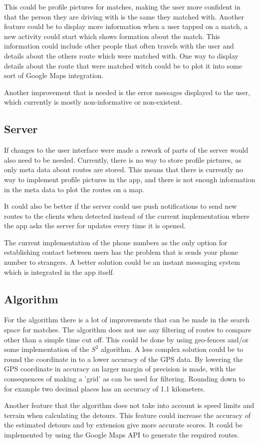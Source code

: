 This could be profile pictures for matches, making the user more confident in that the person they are driving with is the same they matched with.
Another feature could be to display more information when a user tapped on a match, a new activity could start which shows formation about the match.
This information could include other people that often travels with the user and details about the others route which were matched with.
One way to display details about the route that were matched witch could be to plot it into some sort of Google Maps integration.

Another improvement that is needed is the error messages displayed to the user, which currently is mostly non-informative or non-existent.

\subsection{Server}
If changes to the user interface were made a rework of parts of the server would also need to be needed.
Currently, there is no way to store profile pictures, as only meta data about routes are stored.
This means that there is currently no way to implement profile pictures in the app, and there is not enough information in the meta data to plot the routes on a map.

It could also be better if the server could use push notifications to send new routes to the clients when detected instead of the current implementation where the app asks the server for updates every time it is opened.

The current implementation of the phone numbers as the only option for establishing contact between users has the problem that is sends your phone number to strangers.
A better solution could be an instant messaging system which is integrated in the app itself.

\subsection{Algorithm}
For the algorithm there is a lot of improvements that can be made in the search space for matches.
The algorithm does not use any filtering of routes to compare other than a simple time cut off.
This could be done by using geo-fences and/or some implementation of the $S^2$ algorithm.
A less complex solution could be to round the coordinate in to a lower accuracy of the GPS data.
By lowering the GPS coordinate in accuracy an larger margin of precision is made, with the consequences of making a 'grid' as can be used for filtering.
Rounding down to for example two decimal places has an accuracy of 1.1 kilometers.

Another feature that the algorithm does not take into account is speed limits and terrain when calculating the detours.
This feature could increase the accuracy of the estimated detours and by extension give more accurate scores.
It could be implemented by using the Google Maps API to generate the required routes.

